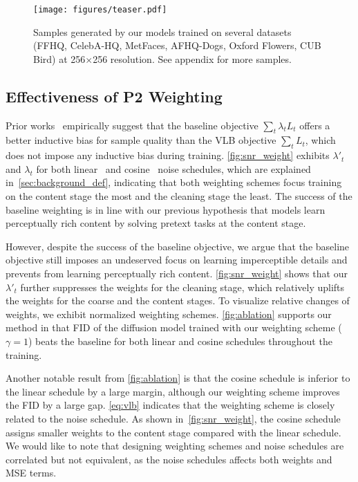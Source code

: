 \begin{figure*}[t!]
  \centering
  \texttt{[image: figures/teaser.pdf]}
  \caption{Samples generated by our models trained on several datasets (FFHQ, CelebA-HQ, MetFaces, AFHQ-Dogs, Oxford Flowers, CUB Bird) at 256$\times$256 resolution. See appendix for more samples.}
  \label{fig:teaser}
\end{figure*}

\subsection{Effectiveness of P2 Weighting}
\label{sec:method_3.3}
Prior works~\cite{ho2020denoising,nichol2021improved} empirically suggest that the baseline objective $\sum_t\lambda _t L_t$ offers a better inductive bias for sample quality than the VLB objective $\sum_t L_t$, which does not impose any inductive bias during training. \cref{fig:snr_weight} exhibits $\lambda'_t$ and $\lambda_t$ for both linear~\cite{ho2020denoising} and cosine~\cite{nichol2021improved} noise schedules, which are explained in~\cref{sec:background_def}, indicating that both weighting schemes focus training on the content stage the most and the cleaning stage the least. The success of the baseline weighting is in line with our previous hypothesis that models learn perceptually rich content by solving pretext tasks at the content stage.

However, despite the success of the baseline objective, we argue that the baseline objective still imposes an undeserved focus on learning imperceptible details and prevents from learning perceptually rich content. \cref{fig:snr_weight} shows that our $\lambda'_t$ further suppresses the weights for the cleaning stage, which relatively uplifts the weights for the coarse and the content stages. To visualize relative changes of weights, we exhibit normalized weighting schemes.
\cref{fig:ablation} supports our method in that FID of the diffusion model trained with our weighting scheme ($\gamma = 1$) beats the baseline for both linear and cosine schedules throughout the training. 

Another notable result from \cref{fig:ablation} is that the cosine schedule is inferior to the linear schedule by a large margin, although our weighting scheme improves the FID by a large gap. 
\cref{eq:vlb} indicates that the weighting scheme is closely related to the noise schedule.
As shown in~\cref{fig:snr_weight}, the cosine schedule assigns smaller weights to the content stage compared with the linear schedule. We would like to note that designing weighting schemes and noise schedules are correlated but not equivalent, as the noise schedules affects both weights and MSE terms.

